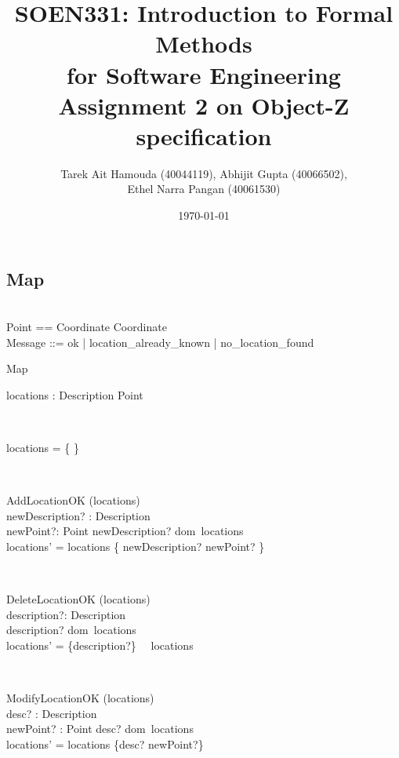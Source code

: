 \documentclass[12pt]{article}
\title{SOEN331: Introduction to Formal Methods\\for Software Engineering\\
Assignment 2 on Object-Z specification}
\author{Tarek Ait Hamouda (40044119), Abhijit Gupta (40066502),\\ 
Ethel Narra Pangan (40061530)}
\date{\today}
\begin{document}
\begin{spacing}{1.5}

\maketitle

\newpage

\section{Map}
\begin{zed}
 \\
Point == Coordinate \times Coordinate \\
Message ::= ok | location\_already\_known | no\_location\_found \\ 
\end{zed}
\begin{class}{Map}
\begin{state}
locations : Description \pfun Point\\
\end{state} \\
\begin{init}
locations = \{ \}
\end{init} \\
\begin{op}{AddLocationOK}
\Delta (locations) \\
newDescription? : Description\\
newPoint?: Point 
\ST
newDescription? \notin dom~locations \\
locations' = locations \cup \{ newDescription? \to newPoint? \}
\end{op}\\
\begin{op}{DeleteLocationOK}
\Delta (locations) \\
description?: Description\\
\ST
description? \in dom~locations\\
locations' = \{description?\}~ \ooalign{$\triangleleft$\cr\hidewidth\scalebox{.65}[1]{$-$}\hidewidth\cr} ~locations
\end{op}\\
\begin{op}{ModifyLocationOK}
\Delta (locations) \\
desc? : Description\\
newPoint? : Point
\ST
desc? \in dom~locations \\
locations' = locations \oplus \{desc? \to newPoint?\}

\end{op}
\end{class}
\end{spacing}
\end{document}
